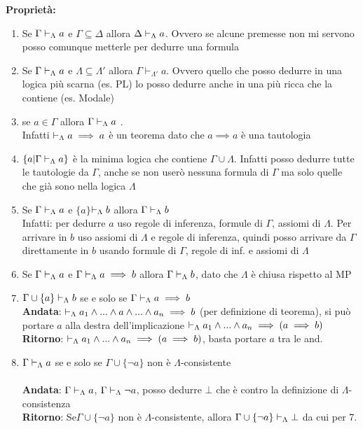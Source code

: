 \textbf{Proprietà:} $ $ 
\begin{enumerate}
\item Se $\Gamma\vdash_{\Lambda}a$ e $\Gamma\subseteq\Delta$ allora $\Delta\vdash_{\Lambda}a$.
Ovvero se alcune premesse non mi servono posso comunque metterle per
dedurre una formula 
\item Se $\Gamma\vdash_{\Lambda}a$ e $\Lambda\subseteq\Lambda'$ allora $\Gamma\vdash_{\Lambda'}a$.
Ovvero quello che posso dedurre in una logica più scarna (es. PL)
lo posso dedurre anche in una più ricca che la contiene (es. Modale) 
\item se $a\in\Gamma$ allora $\Gamma\vdash_{\Lambda}a$ . \\
 Infatti $\vdash_{\Lambda}a\implies a$ è un teorema dato che $a\implies a$
è una tautologia 
\item $\{a|\Gamma\vdash_{\Lambda}a\}$ è la minima logica che contiene $\Gamma\cup\Lambda$.
Infatti posso dedurre tutte le tautologie da $\Gamma$, anche se non
userò nessuna formula di $\Gamma$ ma solo quelle che già sono nella
logica $\Lambda$ $ $ 
\item Se $\Gamma\vdash_{\Lambda}a$ e $\{a\}$$\vdash_{\Lambda}b$ allora $\Gamma\vdash_{\Lambda}b$ \\
 Infatti: per dedurre $a$ uso regole di inferenza, formule di $\Gamma$,
assiomi di $\Lambda$. Per arrivare in $b$ uso assiomi di $\Lambda$
e regole di inferenza, quindi posso arrivare da $\Gamma$ direttamente
in $b$ usando formule di $\Gamma$, regole di inf. e assiomi di $\Lambda$ 
\item Se $\Gamma\vdash_{\Lambda}a$ e $\Gamma\vdash_{\Lambda}a\implies b$ allora $\Gamma\vdash_{\Lambda}b$, dato
che $\Lambda$ è chiusa rispetto al MP 
\item $\Gamma\cup\{a\}\vdash_{\Lambda}b$ se e solo se $\Gamma\vdash_{\Lambda}a\implies b$
\\
 \textbf{Andata}: $\vdash_{\Lambda}a_{1}\wedge...\wedge a\wedge...\wedge a_{n}\implies b$
(per definizione di teorema), si può portare $a$ alla destra dell'implicazione
$\vdash_{\Lambda}a_{1}\wedge...\wedge a_{n}\implies(a\implies b)$ \\
 \textbf{Ritorno}: $\vdash_{\Lambda}a_{1}\wedge...\wedge a_{n}\implies(a\implies b)$,
basta portare $a$ tra le $ $and. 
\item $\Gamma\vdash_{\Lambda}a$ se e solo se $\Gamma\cup\{\neg a\}$ non è $\Lambda$-consistente
\\
 \\
 \textbf{Andata}: $\Gamma\vdash_{\Lambda}a$, $\Gamma\vdash_{\Lambda}\neg a$, posso dedurre
$\bot$ che è contro la definizione di $\Lambda$-consistenza\\
 \textbf{Ritorno}: Se$ $$\Gamma\cup\{\neg a\}$ non è $\Lambda$-consistente,
allora $\Gamma\cup\{\neg a\}\vdash_{\Lambda}\bot$ da cui per 7. \\

\end{enumerate}
